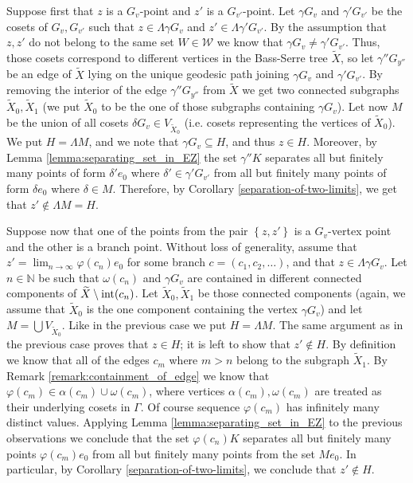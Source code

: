 \documentclass[12pt, a4paper]{article}
\newcommand{\NN}{\mathbb{N}} \newcommand{\ZZ}{\mathbb{Z}}
\newcommand{\8}{\infty}
\newcommand{\set}[1]{\left\{ #1 \right\}}
\theoremstyle{break}
\theoremstyle{defbreak}
\newcommand{\wtl}[1]{\widetilde{#1}}
\begin{document}
\begin{itemize}
        Suppose first that $z$ is a $G_v$-point and $z'$ is a $G_{v'}$-point. Let $\gamma G_v$ and $\gamma'G_{v'}$ be the cosets of $G_v, G_{v'}$ such that $z\in \Lambda \gamma G_v$ and $z'\in \Lambda \gamma' G_{v'}$. By the assumption that $z,z'$ do not belong to the same set $W\in \mathcal{W}$ we know that $\gamma G_v \neq \gamma'G_{v'}$. Thus, those cosets correspond to different vertices in the Bass-Serre tree $\wtl{X}$, so let $\gamma''G_{y''}$ be an edge of $\wtl{X}$ lying on the unique geodesic path joining $\gamma G_v$ and $\gamma'G_{v'}$. By removing the interior of the edge $\gamma''G_{y''}$ from $\wtl{X}$ we get two connected subgraphs $\wtl{X}_0,\wtl{X}_1$ (we put $\wtl{X}_0$ to be the one of those subgraphs containing $\gamma G_v$). Let now $M$ be the union of all cosets $\delta G_v\in V_{\wtl{X}_0}$ (i.e. cosets representing the vertices of $\wtl{X}_0$). We put $H = \Lambda M$, and we note that $\gamma G_v \subseteq H$, and thus $z\in H$. Moreover, by Lemma \ref{lemma:separating_set_in_EZ} the set $\gamma''K$ separates all but finitely many points of form $\delta' e_0$ where $\delta' \in \gamma'G_{v'}$ from all but finitely many points of form $\delta e_0$ where $\delta\in M$. Therefore, by Corollary \ref{separation-of-two-limits}, we get that $z'\not\in \Lambda M = H$.

        Suppose now that one of the points from the pair $\set{z,z'}$ is a $G_v$-vertex point and the other is a branch point. Without loss of generality, assume that $z' = \lim_{n\to \8}\varphi(c_n)e_0$ for some branch $c = (c_1, c_2, \ldots)$, and that $z\in \Lambda \gamma G_v$. Let $n\in \NN$ be such that $\omega(c_n)$ and $\gamma G_v$ are contained in different connected components of $\wtl{X}\setminus \hbox{int}(c_n)$. Let $\wtl{X}_0, \wtl{X}_1$ be those connected components (again, we assume that $\wtl{X}_0$ is the one component containing the vertex $\gamma G_v$) and let $M=\bigcup V_{\wtl{X}_0}$. Like in the previous case we put $H = \Lambda M$. The same argument as in the previous case proves that $z\in H$; it is left to show that $z'\not\in H$. By definition we know that all of the edges $c_m$ where $m>n$ belong to the subgraph $\wtl{X}_1$. By Remark \ref{remark:containment_of_edge} we know that $\varphi(c_m) \in \alpha(c_m)\cup\omega(c_m)$, where vertices $\alpha(c_m), \omega(c_m)$ are treated as their underlying cosets in $\Gamma$. Of course sequence $\varphi(c_m)$ has infinitely many distinct values. Applying Lemma \ref{lemma:separating_set_in_EZ} to the previous observations we conclude that the set $\varphi(c_n)K$ separates all but finitely many points $\varphi(c_m)e_0$ from all but finitely many points from the set $Me_0$. In particular, by Corollary \ref{separation-of-two-limits}, we conclude that $z'\not\in H$.


\end{itemize}
\end{document}
